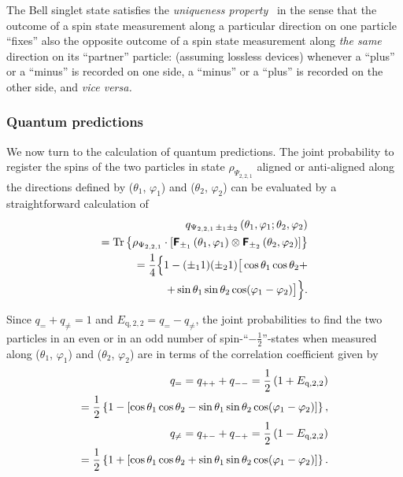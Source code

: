 \documentclass[%
  twocolumn,
 showpacs,
 showkeys,
 preprintnumbers,
 amsmath,amssymb,
 aps,
  pra,
  longbibliography,
 floatfix,
 ]{revtex4-1}
\begin{document}
The Bell singlet state satisfies the {\em uniqueness property}~\cite{svozil-2006-uniquenessprinciple}
in the sense that the outcome of a spin state measurement
along a particular direction on one particle ``fixes'' also the opposite outcome of a spin state measurement
along {\em the same} direction on its ``partner'' particle: (assuming lossless devices)
whenever a ``plus'' or a ``minus'' is recorded on one side,
a ``minus'' or a ``plus'' is recorded on the other side, and {\it vice versa.}




\subsubsection{Quantum predictions}

We now turn to the calculation of quantum predictions.
The joint probability to register the spins of the two particles
in state $\rho_{\Psi_{2,2,1}}$
aligned or anti-aligned along the directions defined by
($\theta_1$, $\varphi_1 $) and
($\theta_2$, $\varphi_2 $)
can be evaluated by a straightforward calculation of
\begin{equation}
\begin{split}
q_{{ \Psi_{2,2,1}}\,\pm_1 \pm_2 } \left(\theta_1, \varphi_1 ; \theta_2,\varphi_2 \right)\\
=
{\rm Tr}\left\{\rho_{ \Psi_{2,2,1}} \cdot
\left[\textsf{\textbf{F}}_{\pm_1} \left(\theta_1, \varphi_1\right) \otimes
\textsf{\textbf{F}}_{\pm_2 }\left(\theta_2,\varphi_2 \right)
\right]\right\} \\
=\frac{1}{4}
\Big\{ 1-(\pm_1 1)( \pm_2 1) \big[\cos \theta_1 \cos \theta_2 + \\
+\sin \theta_1 \sin \theta_2 \cos (\varphi_1-\varphi_2) \big]\Big\}
.
\end{split}
\end{equation}

Since $q_= + q_{\neq} = 1$ and $E_{\text{q},2,2}= q_= - q_{\neq}$, the joint probabilities to find the two particles
in an even or in an odd number of
spin-``$-\frac{1}{2}$''-states when measured along
($\theta_1$, $\varphi_1 $) and
($\theta_2$, $\varphi_2 $)
are in terms of the correlation coefficient given by
\begin{equation}
\begin{split}
q_= = q_{++}+q_{--} =
{1\over2}\left(1 + E_{\text{q},2,2}  \right)  \\
=\frac{1}{2} \left\{ 1- \left[\cos \theta_1 \cos \theta_2 - \sin \theta_1 \sin \theta_2 \cos (\varphi_1-\varphi_2) \right]\right\}
,
\\
q_{\neq} = q_{+-}+q_{-+} =
{1\over2}\left(1 - E_{\text{q},2,2} \right)   \\
=\frac{1}{2} \left\{ 1+ \left[\cos \theta_1 \cos \theta_2 + \sin \theta_1 \sin \theta_2 \cos (\varphi_1-\varphi_2) \right]\right\}
.
\end{split}
\end{equation}
\end{document}
